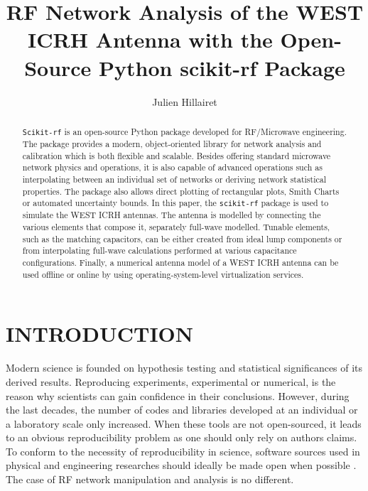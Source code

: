 \documentclass[%
aip,
cp,  %
amsmath,amssymb,%
reprint,%
]{revtex4-2}
\begin{document}
	
	\title{RF Network Analysis of the WEST ICRH Antenna with the Open-Source Python scikit-rf Package}
	
	\author{Julien Hillairet}

	
	\begin{abstract}
		\texttt{Scikit-rf} is an open-source Python package developed for RF/Microwave engineering. The package provides a modern, object-oriented library for network analysis and calibration which is both flexible and scalable. Besides offering standard microwave network physics and operations, it is also capable of advanced operations such as interpolating between an individual set of networks or deriving network statistical properties. The package also allows direct plotting of rectangular plots, Smith Charts or automated uncertainty bounds. In this paper, the \texttt{scikit-rf} package is used to simulate the WEST ICRH antennas. The antenna is modelled by connecting the various elements that compose it, separately full-wave modelled. Tunable elements, such as the matching capacitors, can be either created from ideal lump components or from interpolating full-wave calculations performed at various capacitance configurations. Finally, a numerical antenna model of a WEST ICRH antenna can be used offline or online by using operating-system-level virtualization services.
	\end{abstract}
	
	\maketitle	
	
	\section{INTRODUCTION}
	Modern science is founded on hypothesis testing and statistical significances of its derived results. Reproducing experiments, experimental or numerical, is the reason why scientists can gain confidence in their conclusions. However, during the last decades, the number of codes and libraries developed at an individual or a laboratory scale only increased. When these tools are not open-sourced, it leads to an obvious reproducibility problem as one should only rely on authors claims. To conform to the necessity of reproducibility in science,  software sources used in physical and engineering researches should ideally be made open when possible \cite{Ince2012}. The case of RF network manipulation and analysis is no different.  
	
\end{document}

